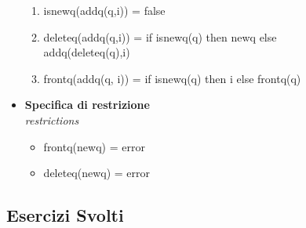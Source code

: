 \documentclass{article}
\begin{document}
\begin{itemize}
\begin{enumerate}
			\item isnewq(addq(q,i)) = false
			\item deleteq(addq(q,i)) = if isnewq(q) then newq else \\ addq(deleteq(q),i)
			\item frontq(addq(q, i)) = if isnewq(q) then i else frontq(q)
		\end{enumerate}
		\item \textbf{Specifica di restrizione} \\ \textit{restrictions}
		\begin{itemize}
			\item frontq(newq) = error
			\item deleteq(newq) = error
		\end{itemize}
	\end{itemize}
	\newpage
	\subsection{Esercizi Svolti}
\end{document}

